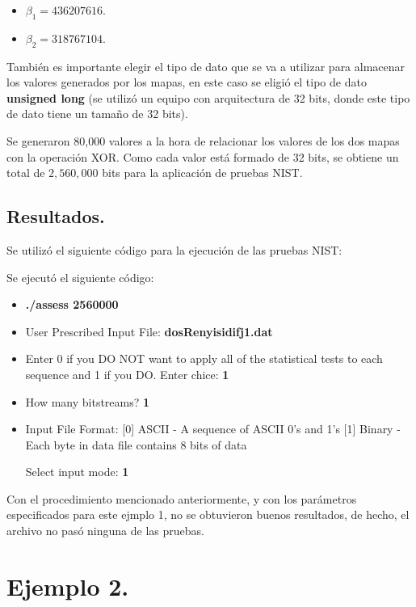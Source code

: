 \documentclass[12pt,3p]{elsarticle}
\begin{document}
\begin{itemize}
\item $\beta_{1}=436207616$.
\item $\beta_{2}=318767104$.
\end{itemize}



 
También es importante elegir el tipo de dato que se va a utilizar para almacenar los valores generados por los mapas, en este caso se eligió el tipo de dato \textbf{unsigned long} (se utilizó un equipo con arquitectura de 32 bits, donde este tipo de dato tiene un tamaño de 32 bits).

Se generaron 80,000 valores  a la hora de relacionar los valores de los dos mapas con la operación XOR. Como cada valor está formado de 32 bits, se  obtiene un total de $2,560,000$ bits para la aplicación de pruebas NIST.



\subsection{Resultados.}

Se utilizó el siguiente código para la ejecución de las pruebas NIST:

Se ejecutó el siguiente código:

\begin{itemize}
\item \textbf{./assess 2560000}
\item User Prescribed Input File: \textbf{dosRenyisidifj1.dat}
\item    Enter 0 if you DO NOT want to apply all of the
         statistical tests to each sequence and 1 if you DO. Enter chice: \textbf{1}
                  
\item  How many bitstreams? \textbf{1}

\item Input File Format:
    [0] ASCII - A sequence of ASCII 0's and 1's
    [1] Binary - Each byte in data file contains 8 bits of data

   Select input mode:  \textbf{1}
\end{itemize}


Con el procedimiento mencionado anteriormente, y con los parámetros especificados para este ejmplo 1, no se obtuvieron buenos resultados, de hecho, el archivo no pasó ninguna de las pruebas.


\section{Ejemplo 2.}
\end{document}
